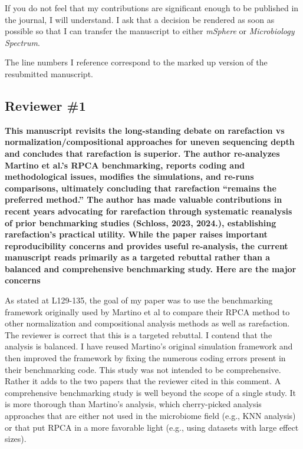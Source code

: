 \documentclass[
  11pt,
]{article}
\begin{document}
If you do not feel that my contributions are significant enough to be
published in the journal, I will understand. I ask that a decision be
rendered as soon as possible so that I can transfer the manuscript to
either \emph{mSphere} or \emph{Microbiology Spectrum}.

The line numbers I reference correspond to the marked up version of the
resubmitted manuscript.

\subsection{Reviewer \#1}\label{reviewer-1}

\textbf{This manuscript revisits the long-standing debate on rarefaction
vs normalization/compositional approaches for uneven sequencing depth
and concludes that rarefaction is superior. The author re-analyzes
Martino et al.'s RPCA benchmarking, reports coding and methodological
issues, modifies the simulations, and re-runs comparisons, ultimately
concluding that rarefaction ``remains the preferred method.'' The author
has made valuable contributions in recent years advocating for
rarefaction through systematic reanalysis of prior benchmarking studies
(Schloss, 2023, 2024.), establishing rarefaction's practical utility.
While the paper raises important reproducibility concerns and provides
useful re-analysis, the current manuscript reads primarily as a targeted
rebuttal rather than a balanced and comprehensive benchmarking study.
Here are the major concerns}

As stated at L129-135, the goal of my paper was to use the benchmarking
framework originally used by Martino et al to compare their RPCA method
to other normalization and compositional analysis methods as well as
rarefaction. The reviewer is correct that this is a targeted rebuttal. I
contend that the analysis is balanced. I have reused Martino's original
simulation framework and then improved the framework by fixing the
numerous coding errors present in their benchmarking code. This study
was not intended to be comprehensive. Rather it adds to the two papers
that the reviewer cited in this comment. A comprehensive benchmarking
study is well beyond the scope of a single study. It is more thorough
than Martino's analysis, which cherry-picked analysis approaches that
are either not used in the microbiome field (e.g., KNN analysis) or that
put RPCA in a more favorable light (e.g., using datasets with large
effect sizes).
\end{document}
